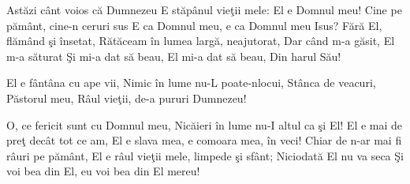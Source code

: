 
\beginverse
Astăzi cânt voios că Dumnezeu
E stăpânul vieţii mele: El e Domnul meu!
Cine pe pământ, cine-n ceruri sus
E ca Domnul meu, e ca Domnul meu Isus?
Fără El, flămând şi însetat,
Rătăceam în lumea largă, neajutorat,
Dar când m-a găsit, El m-a săturat
Şi mi-a dat să beau, El mi-a dat să beau,
Din harul Său!
\endverse

\beginchorus
El e fântâna cu ape vii,
Nimic în lume nu-L poate-nlocui,
Stânca de veacuri, Păstorul meu,
Râul vieţii, de-a pururi Dumnezeu!
\endchorus

\beginverse
O, ce fericit sunt cu Domnul meu,
Nicăieri în lume nu-I altul ca şi El!
El e mai de preţ decât tot ce am,
El e slava mea, e comoara mea, în veci!
Chiar de n-ar mai fi râuri pe pământ,
El e râul vieţii mele, limpede şi sfânt;
Niciodată El nu va seca
Şi voi bea din El, eu voi bea din El mereu!
\endverse

\endsong
